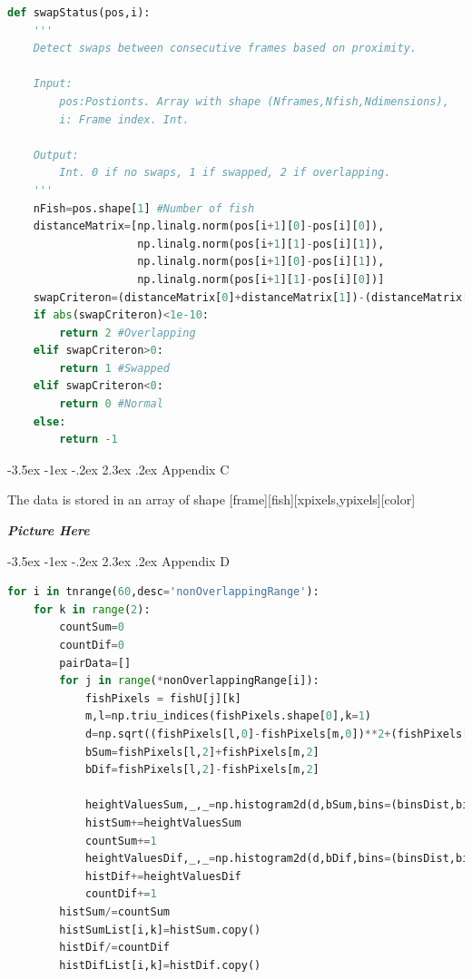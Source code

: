 \documentclass{article}
\makeatletter
\renewcommand\section{\clearpage\newpage\@startsection {section}{1}{\z@}%
	{-3.5ex \@plus -1ex \@minus -.2ex}%
	{2.3ex \@plus.2ex}%
	{\normalfont\Large\bfseries}}
\makeatother
\begin{document}
\begin{minipage}[c]{\textwidth}
\begin{lstlisting}[language=Python]
def swapStatus(pos,i):
    '''
    Detect swaps between consecutive frames based on proximity.
    
    Input:
        pos:Postionts. Array with shape (Nframes,Nfish,Ndimensions),
        i: Frame index. Int.
    
    Output:
        Int. 0 if no swaps, 1 if swapped, 2 if overlapping.
    '''
    nFish=pos.shape[1] #Number of fish
    distanceMatrix=[np.linalg.norm(pos[i+1][0]-pos[i][0]),
                    np.linalg.norm(pos[i+1][1]-pos[i][1]),
                    np.linalg.norm(pos[i+1][0]-pos[i][1]),
                    np.linalg.norm(pos[i+1][1]-pos[i][0])]
    swapCriteron=(distanceMatrix[0]+distanceMatrix[1])-(distanceMatrix[2]+distanceMatrix[3])
    if abs(swapCriteron)<1e-10:
        return 2 #Overlapping
    elif swapCriteron>0:
        return 1 #Swapped
    elif swapCriteron<0:
        return 0 #Normal
    else:
        return -1
\end{lstlisting}
\end{minipage}

\section{Appendix C}
\label{app:dataShape}

The data is stored in an array of shape [frame][fish][xpixels,ypixels][color]

\textit{\textbf{Picture Here}}

\section{Appendix D}
\label{app:histCreator}

\begin{minipage}[c]{\textwidth}
\begin{lstlisting}[language=Python]
for i in tnrange(60,desc='nonOverlappingRange'):
    for k in range(2):
        countSum=0
        countDif=0
        pairData=[]
        for j in range(*nonOverlappingRange[i]):
            fishPixels = fishU[j][k]
            m,l=np.triu_indices(fishPixels.shape[0],k=1)
            d=np.sqrt((fishPixels[l,0]-fishPixels[m,0])**2+(fishPixels[l,1]-fishPixels[m,1])**2)
            bSum=fishPixels[l,2]+fishPixels[m,2]
            bDif=fishPixels[l,2]-fishPixels[m,2]

            heightValuesSum,_,_=np.histogram2d(d,bSum,bins=(binsDist,binsSum))
            histSum+=heightValuesSum
            countSum+=1
            heightValuesDif,_,_=np.histogram2d(d,bDif,bins=(binsDist,binsDif))
            histDif+=heightValuesDif
            countDif+=1
        histSum/=countSum
        histSumList[i,k]=histSum.copy()
        histDif/=countDif
        histDifList[i,k]=histDif.copy()
\end{lstlisting}
\end{minipage}




\end{document}
